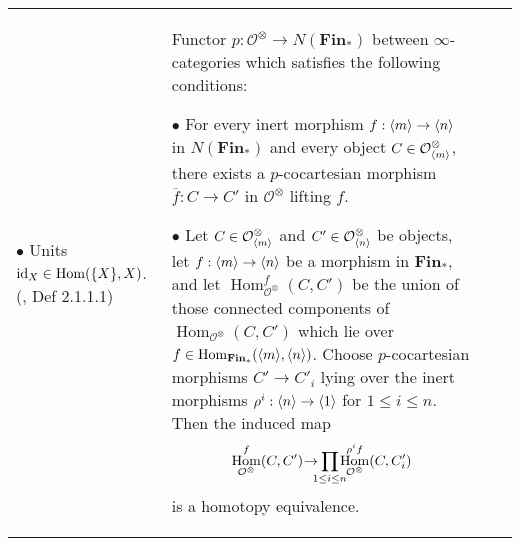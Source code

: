 \documentclass{article}
\DeclareMathOperator{\Hom}{Hom}
\def\id{\ensuremath\text{id}}
\begin{document}
\begin{centre}
\begin{longtable}{ |p{3.2cm}||p{5cm}|p{5.2cm}|p{5cm}|  }
\(\bullet\) Units \(\id_X \in \Hom(\{X\}, X)\). (\autocite{ha}, Def 2.1.1.1)
 & Functor \(p : \mathcal{O}^\otimes \to N(\textbf{Fin}_*)\) between \(\infty\)-categories which satisfies the following conditions:

\(\bullet\) For every inert morphism \(f : \langle m\rangle\to \langle n\rangle\) in \(N(\textbf{Fin}_*)\) and every object \(C\in \mathcal{O}^\otimes_{\langle m\rangle}\), there exists a \(p\)-cocartesian morphism \(\overline f : C \to C'\) in \(\mathcal{O}^\otimes\) lifting \(f\).

\(\bullet\) Let \(C \in \mathcal{O}^\otimes_{\langle m\rangle}\) and \(C'\in \mathcal{O}^\otimes_{\langle n\rangle}\) be objects, let \(f : \langle m\rangle\to \langle n\rangle\) be a morphism in \(\textbf{Fin}_*\), and let \(\Hom^f_{\mathcal{O}^\otimes}(C,C')\) be the union of those connected components of \(\Hom_{\mathcal{O}^\otimes}(C,C')\) which lie over \(f\in \Hom_{\textbf{Fin}_*}(\ang{m}, \ang{n})\). Choose \(p\)-cocartesian morphisms \(C' \to C'_i\) lying over the inert morphisms \(\rho^i : \langle n\rangle\to \langle1\rangle\) for \(1 \leq i \leq n\). Then the induced map
\[\Hom^f_{\mathcal{O}^\otimes}(C,C')\hspace{-0.5ex}\to\hspace{-1.5ex}\prod_{1\leq i\leq n}\hspace{-1.5ex}\Hom^{\rho^i f}_{\mathcal{O}^\otimes}(C,C_i')\]
is a homotopy equivalence.


\end{longtable}
\end{centre}
\end{document}
